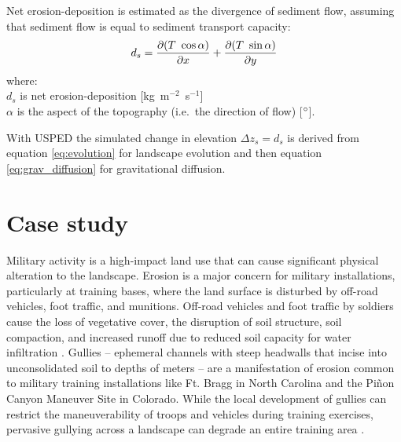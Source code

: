 \documentclass[gmd, manuscript]{copernicus}
\begin{document}
\noindent
Net erosion-deposition is estimated as the divergence of sediment flow, 
assuming that sediment flow is equal to sediment transport capacity: 
\begin{equation}\label{eq:usped_erdep} 
d_s = 
{\partial (T ~ \cos \alpha) \over \partial x} +
{\partial (T ~ \sin \alpha) \over \partial y}
\end{equation}
{\small
\noindent
where: \\
\hspace*{0.5em} $d_s$ is net erosion-deposition [\unit{kg~m}$^{-2}$~\unit{s}$^{-1}$]\\
\hspace*{0.5em} $\alpha$ is the aspect of the topography (i.e.~the direction of flow) [$^{\circ}$].\\
}

\noindent
With USPED the simulated change in elevation $\Delta z_s=d_s$
is derived from equation \ref{eq:evolution} for landscape evolution
and then equation \ref{eq:grav_diffusion}
for gravitational diffusion.


\section{Case study} 

Military activity is a high-impact land use 
that can cause significant physical alteration to the landscape. 
Erosion is a major concern for military installations, 
particularly at training bases, 
where the land surface is disturbed by 
off-road vehicles, foot traffic, and munitions. 
Off-road vehicles and foot traffic by soldiers 
cause the loss of vegetative cover, 
the disruption of soil structure, soil compaction, 
and increased runoff due to 
reduced soil capacity for water infiltration 
\citep{Webb1983, McDonald2004}.
Gullies -- ephemeral channels with steep headwalls 
that incise into unconsolidated soil to depths of meters -- 
are a manifestation of erosion common to 
military training installations like Ft. Bragg in North Carolina 
and the Pi\~{n}on Canyon Maneuver Site in Colorado. 
While the local development of gullies can restrict 
the maneuverability of troops and vehicles during training exercises, 
pervasive gullying across a landscape 
can degrade an entire training area 
\citep{Huang2014}.
\end{document}
